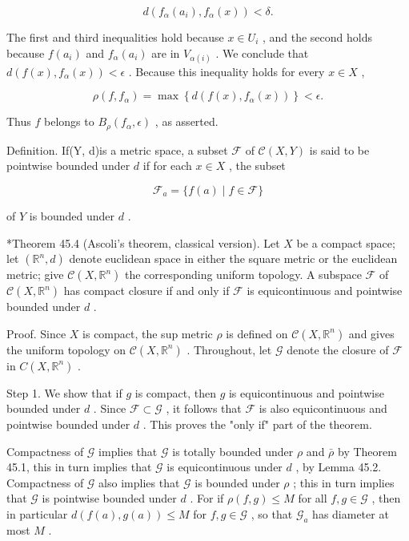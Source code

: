 \[
d\left( {{f}_{\alpha }\left( {a}_{i}\right) ,{f}_{\alpha }\left( x\right) }\right)  < \delta .
\]

The first and third inequalities hold because \(x \in  {U}_{i}\) , and the second holds because \(f\left( {a}_{i}\right)\) and \({f}_{\alpha }\left( {a}_{i}\right)\) are in \({V}_{\alpha \left( i\right) }\) . We conclude that \(d\left( {f\left( x\right) ,{f}_{\alpha }\left( x\right) }\right)  < \epsilon\) . Because this inequality holds for every \(x \in  X\) ,

\[
\rho \left( {f,{f}_{\alpha }}\right)  = \max \left\{  {d\left( {f\left( x\right) ,{f}_{\alpha }\left( x\right) }\right) }\right\}   < \epsilon .
\]

Thus \(f\) belongs to \({B}_{\rho }\left( {{f}_{\alpha },\epsilon }\right)\) , as asserted.

Definition. If(Y, d)is a metric space, a subset \(\mathcal{F}\) of \(\mathcal{C}\left( {X,Y}\right)\) is said to be pointwise bounded under \(d\) if for each \(x \in  X\) , the subset

\[
{\mathcal{F}}_{a} = \{ f\left( a\right)  \mid  f \in  \mathcal{F}\}
\]

of \(Y\) is bounded under \(d\) .

*Theorem 45.4 (Ascoli’s theorem, classical version). Let \(X\) be a compact space; let \(\left( {{\mathbb{R}}^{n},d}\right)\) denote euclidean space in either the square metric or the euclidean metric; give \(\mathcal{C}\left( {X,{\mathbb{R}}^{n}}\right)\) the corresponding uniform topology. A subspace \(\mathcal{F}\) of \(\mathcal{C}\left( {X,{\mathbb{R}}^{n}}\right)\) has compact closure if and only if \(\mathcal{F}\) is equicontinuous and pointwise bounded under \(d\) .

Proof. Since \(X\) is compact, the sup metric \(\rho\) is defined on \(\mathcal{C}\left( {X,{\mathbb{R}}^{n}}\right)\) and gives the uniform topology on \(\mathcal{C}\left( {X,{\mathbb{R}}^{n}}\right)\) . Throughout, let \(\mathcal{G}\) denote the closure of \(\mathcal{F}\) in \(C\left( {X,{\mathbb{R}}^{n}}\right)\) .

Step 1. We show that if \(g\) is compact, then \(g\) is equicontinuous and pointwise bounded under \(d\) . Since \(\mathcal{F} \subset  \mathcal{G}\) , it follows that \(\mathcal{F}\) is also equicontinuous and pointwise bounded under \(d\) . This proves the "only if" part of the theorem.

Compactness of \(\mathcal{G}\) implies that \(\mathcal{G}\) is totally bounded under \(\rho\) and \(\bar{\rho }\) by Theorem 45.1, this in turn implies that \(\mathcal{G}\) is equicontinuous under \(d\) , by Lemma 45.2. Compactness of \(\mathcal{G}\) also implies that \(\mathcal{G}\) is bounded under \(\rho\) ; this in turn implies that \(\mathcal{G}\) is pointwise bounded under \(d\) . For if \(\rho \left( {f,g}\right)  \leq  M\) for all \(f,g \in  \mathcal{G}\) , then in particular \(d\left( {f\left( a\right) ,g\left( a\right) }\right)  \leq  M\) for \(f,g \in  \mathcal{G}\) , so that \({\mathcal{G}}_{a}\) has diameter at most \(M\) .

